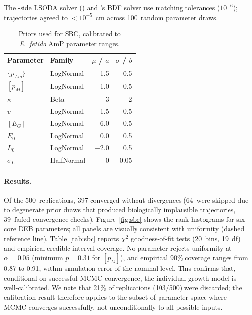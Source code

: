 \documentclass[article,shortnames]{jss}
\newcommand{\pAm}{\{p_{Am}\}}
\newcommand{\pM}{[p_M]}
\newcommand{\EG}{[E_G]}
\begin{document}
\noindent
The -side LSODA solver () and 's BDF
solver use matching tolerances ($10^{-6}$); trajectories agreed to
$< 10^{-5}$~cm across 100~random parameter draws.

\begin{table}[t!]
\centering
\caption{Priors used for SBC, calibrated to \emph{E.~fetida}
  AmP parameter ranges.}
\label{tab:sbc_priors}
\begin{tabular}{llrr}
\toprule
Parameter & Family & $\mu$ / $a$ & $\sigma$ / $b$ \\
\midrule
$\pAm$     & LogNormal  & 1.5    & 0.5  \\
$\pM$      & LogNormal  & $-$1.0 & 0.5  \\
$\kappa$   & Beta       & 3      & 2    \\
$v$        & LogNormal  & $-$1.5 & 0.5  \\
$\EG$      & LogNormal  & 6.0    & 0.5  \\
$E_0$      & LogNormal  & 0.0    & 0.5  \\
$L_0$      & LogNormal  & $-$2.0 & 0.5  \\
$\sigma_L$ & HalfNormal & 0      & 0.05 \\
\bottomrule
\end{tabular}
\end{table}

\paragraph{Results.}
Of the 500~replications, 397 converged without divergences
(64~were skipped due to degenerate prior draws that produced
biologically implausible trajectories, 39~failed convergence
checks).  Figure~\ref{fig:sbc} shows the rank histograms
for six core DEB parameters; all panels are visually consistent with
uniformity (dashed reference line).  Table~\ref{tab:sbc} reports
$\chi^2$ goodness-of-fit tests (20~bins, 19~df) and empirical
credible interval coverage.  No parameter rejects uniformity at
$\alpha = 0.05$ (minimum $p = 0.31$ for $\pM$), and empirical
90\% coverage ranges from 0.87 to 0.91, within simulation error
of the nominal level.  This confirms that, conditional on
successful MCMC convergence, the  individual
growth model is well-calibrated.  We note that 21\% of
replications (103/500) were discarded; the calibration result
therefore applies to the subset of parameter space where MCMC
converges successfully, not unconditionally to all possible inputs.
\end{document}
